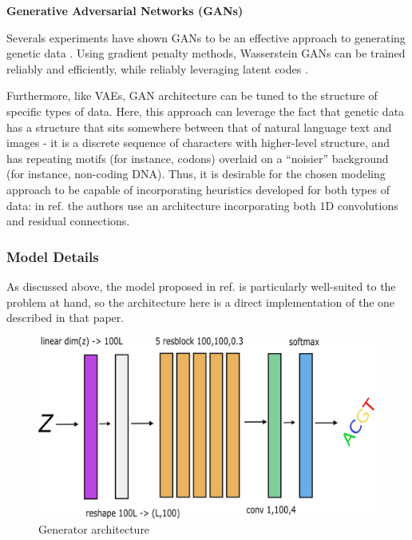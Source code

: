 \documentclass[11pt]{article}
\begin{document}
\textbf{Generative Adversarial Networks (GANs) }

Severals experiments have shown GANs to be an effective approach to generating genetic
data \cite{killoran2017generating, yelmen2019creating}. Using gradient penalty methods, 
Wasserstein GANs can be trained reliably \cite{gulrajani2017improved} and efficiently, 
while reliably leveraging latent codes \cite{killoran2017generating}.

Furthermore, like VAEs, GAN architecture can be tuned to the structure of specific 
types of data. Here, this approach can leverage the fact that genetic data has a 
structure that sits somewhere between that of natural language text and images 
\cite{killoran2017generating} - it is a discrete sequence of characters with 
higher-level structure, and has repeating motifs (for instance, codons) overlaid on 
a ``noisier'' background (for instance, non-coding DNA). Thus, it is desirable for 
the chosen modeling approach to be capable of incorporating heuristics developed for 
both types of data: in ref. \cite{killoran2017generating} the authors use an 
architecture incorporating both 1D convolutions and residual connections. 

\subsubsection{Model Details}

As discussed above, the model proposed in ref. \cite{killoran2017generating} is 
particularly well-suited to the problem at hand, so the architecture here is a direct 
implementation of the one described in that paper. \\

    
\begin{figure}
    \includegraphics{generator.png}
    \caption{Generator architecture}
\end{figure}
\end{document}
